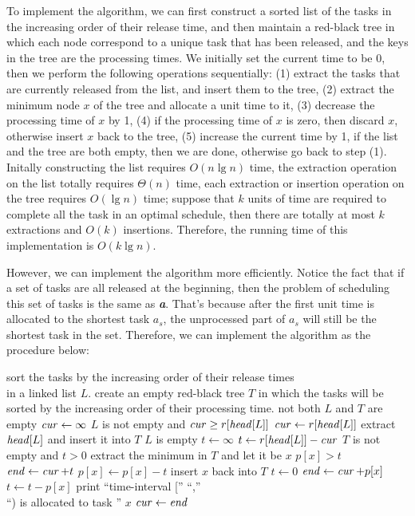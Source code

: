 \documentclass[fleqn]{article}
\begin{document}
\begin{enumerate}
To implement the algorithm, we can first construct a sorted list of
the tasks in the increasing order of their release time, and then
maintain a red-black tree in which each node correspond to a unique
task that has been released, and the keys in the tree are the
processing times. We initially set the current time to be 0, then we
perform the following operations sequentially: (1) extract the tasks
that are currently released from the list, and insert them to the
tree, (2) extract the minimum node $x$ of the tree and allocate a unit
time to it, (3) decrease the processing time of $x$ by 1, (4) if the
processing time of $x$ is zero, then discard $x$, otherwise insert $x$
back to the tree, (5) increase the current time by 1, if the list and
the tree are both empty, then we are done, otherwise go back to step
(1). Initally constructing the list requires $O(n \lg n)$ time, the
extraction operation on the list totally requires $\Theta(n)$ time,
each extraction or insertion operation on the tree requires $O(\lg n)$
time; suppose that $k$ units of time are required to complete all the
task in an optimal schedule, then there are totally at most $k$
extractions and $O(k)$ insertions. Therefore, the running time of this
implementation is $O(k \lg n)$.

However, we can implement the algorithm more efficiently. Notice the
fact that if a set of tasks are all released at the beginning, then
the problem of scheduling this set of tasks is the same as
\textit{\textbf{a}}. That's because after the first unit time is
allocated to the shortest task $a_s$, the unprocessed part of $a_s$
will still be the shortest task in the set. Therefore, we can
implement the algorithm as the procedure below:

\begin{codebox}
\li sort the tasks by the increasing order of their release times \\
    in a linked list $L$.
\li create an empty red-black tree $T$ in which the tasks will be \\
    sorted by the increasing order of their processing time.
\li \While not both $L$ and $T$ are empty
\li   \Do
        $\id{cur} \gets \infty$
\li     \While $L$ is not empty and $\id{cur} \geq r[\id{head}[L]]$
\li       \Do
            $\id{cur} \gets r[\id{head}[L]]$
\li         extract $\id{head}[L]$ and insert it into $T$
          \End
\li     \If $L$ is empty
\li       \Then
            $t \gets \infty$
\li       \Else
            $t \gets r[\id{head}[L]] - \id{cur}$
          \End
\li     \While $T$ is not empty and $t > 0$
\li       \Do
            extract the minimum in $T$ and let it be $x$
\li         \If $p[x] > t$
\li           \Then
                $\id{end} \gets \id{cur} + t$
\li             $p[x] \gets p[x] - t$
\li             insert $x$ back into $T$
\li             $t \gets 0$
\li           \Else
                $\id{end} \gets \id{cur} + p[x]$
\li             $t \gets t - p[x]$
              \End
\li         print ``time-interval [''  ``,''  \\
\>\>\>\>    ``) is allocated to task '' $x$
\li         $\id{cur} \gets \id{end}$
          \End
      \End
\end{codebox}


\end{enumerate}
\end{document}

